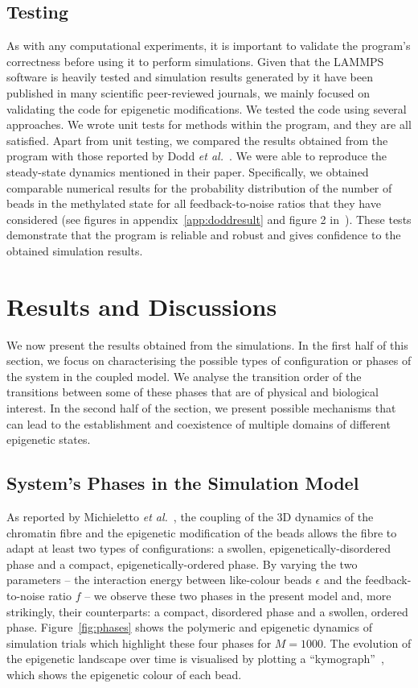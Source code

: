 \documentclass[12pt]{article}
\newcommand{\etal}{\emph{et al.}}
\begin{document}
\FloatBarrier
\subsection{Testing}
As with any computational experiments, it is important to validate the program's correctness before using it to perform simulations. Given that the LAMMPS software is heavily tested and simulation results generated by it have been published in many scientific peer-reviewed journals, we mainly focused on validating the code for epigenetic modifications. We tested the code using several approaches. We wrote unit tests for methods within the program, and they are all satisfied. Apart from unit testing, we compared the results obtained from the program with those reported by Dodd \etal~\cite{dodd2007}. We were able to reproduce the steady-state dynamics mentioned in their paper. Specifically, we obtained comparable numerical results for the probability distribution of the number of beads in the methylated state for all feedback-to-noise ratios that they have considered (see figures in appendix~\ref{app:doddresult} and figure 2 in~\cite{dodd2007}). These tests demonstrate that the program is reliable and robust and gives confidence to the obtained simulation results. 
\pagebreak
\section{Results and Discussions}
We now present the results obtained from the simulations. In the first half of this section, we focus on characterising the possible types of configuration or phases of the system in the coupled model. We analyse the transition order of the transitions between some of these phases that are of physical and biological interest. In the second half of the section, we present possible mechanisms that can lead to the establishment and coexistence of multiple domains of different epigenetic states.

\subsection{System's Phases in the Simulation Model}
As reported by Michieletto \etal~\cite{michieletto2016}, the coupling of the 3D dynamics of the chromatin fibre and the epigenetic modification of the beads allows the fibre to adapt at least two types of configurations: a swollen, epigenetically-disordered phase and a compact, epigenetically-ordered phase. By varying the two parameters -- the interaction energy between like-colour beads $\epsilon$ and the feedback-to-noise ratio $f$ -- we observe these two phases in the present model and, more strikingly, their counterparts: a compact, disordered phase and a swollen, ordered phase. Figure~\ref{fig:phases} shows the polymeric and epigenetic dynamics of simulation trials which highlight these four phases for $M = 1000$. The evolution of the epigenetic landscape over time is visualised by plotting a ``kymograph''~\cite{michieletto2016,brumley2014}, which shows the epigenetic colour of each bead.
\end{document}
